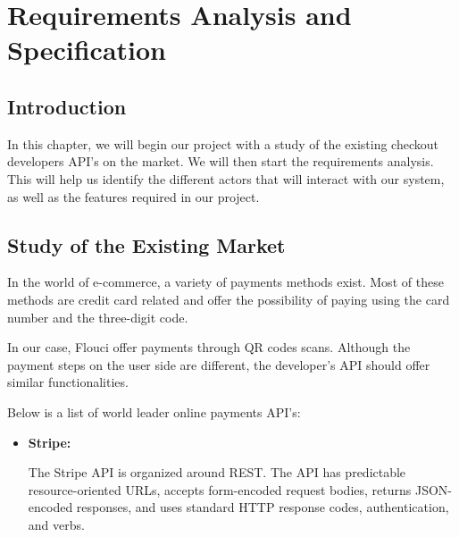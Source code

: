 
\setcounter{chapter}{1}
\chapter{Requirements Analysis and Specification}
\minitoc %
\graphicspath{{Chapter2/figures/}}


\pagestyle{fancy}
\fancyhf{}
\fancyhead[R]{\bfseries\rightmark}
\fancyfoot[R]{\thepage}
\renewcommand{\headrulewidth}{0.5pt}
\renewcommand{\footrulewidth}{0pt}
\renewcommand{\chaptermark}[1]{\markboth{\MakeUppercase{\chaptername~\thechapter. #1 }}{}}
\renewcommand{\sectionmark}[1]{\markright{\thechapter.\thesection~ #1}}

\begin{spacing}{1.2}
\section*{Introduction}
In this chapter, we will begin our project with a study of the existing checkout developers API's on the market. We will then start the requirements analysis. This will help us identify the different actors that will interact with our system, as well as the features required in our project.
\section{Study of the Existing Market}
In the world of e-commerce, a variety of payments methods exist.  Most of these methods are credit card related and offer the possibility of paying using the card number and the three-digit code.

In our case, Flouci offer payments through QR codes scans. Although the payment steps on the user side are different, the developer's API should offer similar functionalities.


Below is a list of world leader online payments API's:
\begin{itemize}
  \item \textbf{Stripe:}

 The Stripe \cite{stripe} API is organized around REST. The API has predictable resource-oriented URLs, accepts form-encoded request bodies, returns JSON-encoded responses, and uses standard HTTP response codes, authentication, and verbs.


\end{itemize}
\end{spacing}
